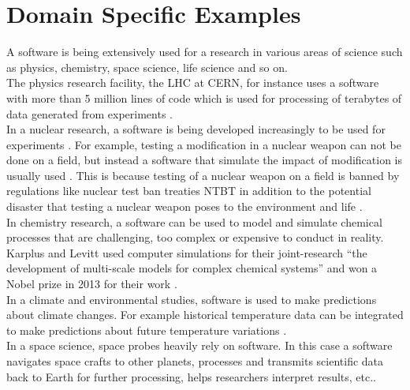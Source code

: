 \section{Domain Specific Examples}
\label{sec:Roles:Domain}

A software is being extensively used for a research in various areas of science such as physics, chemistry, space science, life science and so on.\\

The physics research facility, the \ac{LHC} at \ac{CERN}, for instance uses a software with more than 5 million lines of code which is used for processing of terabytes of data generated from experiments \citep{storer2017bridging}.\\

In a nuclear research, a software is being developed increasingly to be used for experiments \citep{yan2017case}. For example, testing a modification in a nuclear weapon can not be done on a field, but instead a software that simulate the impact of modification is usually used \citep{kanewala2014testing}. This is because testing of a nuclear weapon on a field is banned by regulations like nuclear test ban treaties \ac{NTBT} in addition to the potential disaster that testing a nuclear weapon poses to the environment and life \citep{enwiki:1053274189}. \\


In chemistry research, a software can be used to model and simulate chemical processes that are challenging, too complex or expensive to conduct in reality. Karplus and Levitt used computer simulations for their joint-research “the development of multi-scale models for complex chemical systems”  and won a Nobel prize in 2013 for their work \citep{storer2017bridging, andre2014nobel}.\\

In a climate and environmental studies, software is used to make predictions about climate changes. For example historical temperature data can be integrated to make predictions about future temperature variations \citep{storer2017bridging}.  \\


In a space science, space probes heavily rely on software. In this case a software navigates space crafts to other planets, processes and transmits scientific data back to Earth for further processing, helps researchers interpret results, etc.\citep{lutz2011software}. \\

